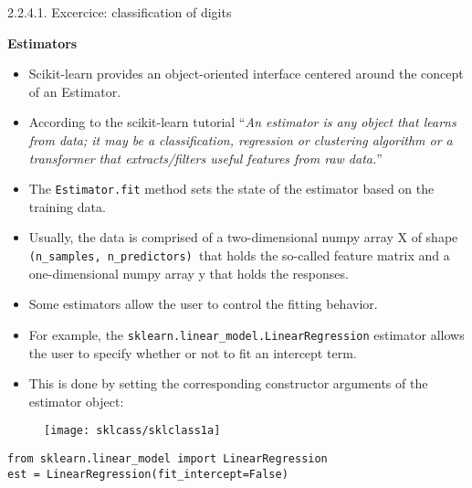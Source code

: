 2.2.4.1. Excercice: classification of digits\documentclass[MASTER.tex]{subfiles}
\begin{document}

	\LARGE
	\textbf{Estimators}
\begin{itemize}
\item Scikit-learn provides an object-oriented interface centered around the concept of an Estimator. \item According to the scikit-learn tutorial “\textit{An estimator is any object that learns from data; it may be a classification, regression or clustering algorithm or a transformer that extracts/filters useful features from raw data.}” 	
\end{itemize}




	\Large
\begin{itemize}
\item The \texttt{Estimator.fit} method sets the state of the estimator based on the training data. 
\item Usually, the data is comprised of a two-dimensional numpy array X of shape \texttt{(n\_samples, n\_predictors) }that holds the so-called feature matrix and a one-dimensional numpy array y that holds the responses. 
\item Some estimators allow the user to control the fitting behavior. 
\end{itemize}




	\Large
	\begin{itemize}
		\item For example, the \texttt{sklearn.linear\_model.LinearRegression} estimator allows the user to specify whether or not to fit an intercept term. 
\item This is done by setting the corresponding constructor arguments of the estimator object:
\end{itemize}


	\begin{figure}
\centering
\texttt{[image: sklcass/sklclass1a]}

\end{figure}

\large
\begin{framed}
\begin{verbatim}
from sklearn.linear_model import LinearRegression
est = LinearRegression(fit_intercept=False)
\end{verbatim}
\end{framed}
\end{document}
